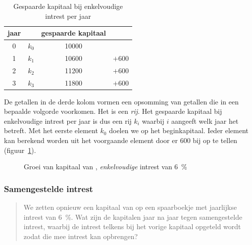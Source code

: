 \begin{table}[htb]
    \centering
    \caption{Gespaarde kapitaal bij enkelvoudige intrest per jaar}
    \begin{tabular}{cccc}
    \toprule
    jaar & & gespaarde kapitaal & \\
    \midrule
    0  	& $k_0$		&	\num{10000}	&	\\
    1	&	$k_1$	&	\num{10600}	&	$+600$\\
    2	&	$k_2$	&	\num{11200}	&	$+600$\\
    3	&	$k_3$	&	\num{11800}	&	$+600$\\
    \bottomrule
     \end{tabular}
    \label{tbl:enkelv_intrest}
\end{table}

De getallen in de derde kolom vormen een opsomming van  getallen die in een bepaalde volgorde voorkomen. Het is een \emph{rij}. Het gespaarde kapitaal bij enkelvoudige intrest per jaar is dus een rij $k_i$ waarbij $i$ aangeeft welk jaar het betreft. Met het eerste element $k_0$ doelen we op het beginkapitaal. Ieder element kan berekend worden uit het voorgaande element door er 600 bij op te tellen (figuur~\ref{fig:enkelvintrest1}).
\begin{figure}[htbp]
    \centering
{}
    \caption{Groei van kapitaal van , \emph{enkelvoudige} intrest van \SI{6}{\percent}}
    \label{fig:enkelvintrest1} 
\end{figure}

\subsubsection*{Samengestelde intrest}
\begin{quote}
   We zetten opnieuw een kapitaal van  op een spaarboekje met
    jaarlijkse intrest van \SI{6}{\percent}. Wat zijn de kapitalen jaar
    na jaar tegen samengestelde intrest, waarbij de intrest telkens bij het vorige
    kapitaal opgeteld wordt zodat die mee intrest kan opbrengen?
\end{quote}

